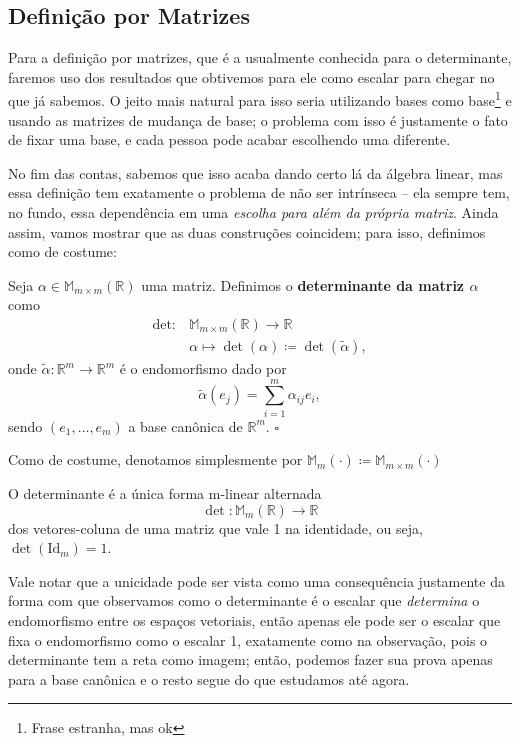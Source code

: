 \documentclass[../differential_forms.tex]{subfiles}
\begin{document}
\subsection{Definição por Matrizes}
Para a definição por matrizes, que é a usualmente conhecida para o determinante, faremos uso dos resultados que obtivemos para ele como
escalar para chegar no que já sabemos. O jeito mais natural para isso seria utilizando bases como base\footnote{Frase estranha, mas ok}
e usando as matrizes de mudança de base; o problema com isso é justamente o fato de fixar uma base, e cada pessoa pode acabar escolhendo
uma diferente.

No fim das contas, sabemos que isso acaba dando certo lá da álgebra linear, mas essa definição tem exatamente o problema de não ser
intrínseca -- ela sempre tem, no fundo, essa dependência em uma \textit{escolha para além da própria matriz}. Ainda assim, vamos mostrar
que as duas construções coincidem; para isso, definimos como de costume:
\begin{def*}
	Seja \(\alpha \in \mathbb{M}_{m\times m}(\mathbb{R})\) uma matriz. Definimos o \textbf{determinante da matriz \(\alpha \)} como
	\begin{align*}
		\mathrm{det}: & \mathbb{M}_{m\times m}(\mathbb{R})\rightarrow \mathbb{R}             \\
		              & \alpha \longmapsto \det{(\alpha )}\coloneqq \det{(\tilde{\alpha })},
	\end{align*}
	onde \(\tilde{\alpha }:\mathbb{R}^{m}\rightarrow \mathbb{R}^{m}\) é o endomorfismo dado por
	\[
		\tilde{\alpha }(e_{j}) =\sum\limits_{i=1}^{m}\alpha_{ij}e_{i},
	\]
	sendo \((e_1, \dotsc , e_{m})\) a base canônica de \(\mathbb{R}^{m}\). \(\square\)
\end{def*}
Como de costume, denotamos simplesmente por \( \mathbb{M}_{m}(\cdot ) \coloneqq \mathbb{M}_{m \times m}(\cdot )\)
\begin{prop*}
	O determinante é a única forma m-linear alternada
	\[
		\det: \mathbb{M}_{m}(\mathbb{R})\rightarrow \mathbb{R}
	\]
	dos vetores-coluna de uma matriz que vale 1 na identidade, ou seja, \(\det{(\mathrm{Id}_{m})}=1\).
\end{prop*}
Vale notar que a unicidade pode ser vista como uma consequência justamente da forma com que observamos como o determinante é o escalar que \textit{determina}
o endomorfismo entre os espaços vetoriais, então apenas ele pode ser o escalar que fixa o endomorfismo como o escalar 1, exatamente como na
observação, pois o determinante tem a reta como imagem; então, podemos fazer sua prova apenas para a base canônica e o resto segue do que estudamos
até agora.
\end{document}
